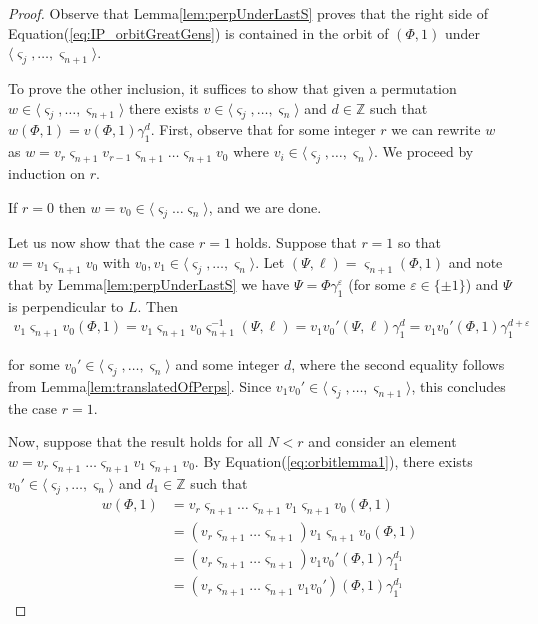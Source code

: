 \documentclass[final]{amsart}
\theoremstyle{plain}
\theoremstyle{definition}
\theoremstyle{remark}
\numberwithin{equation}{section}
\renewcommand{\epsilon}{\varepsilon} \renewcommand{\subset}{\subseteq} \renewcommand{\supset}{\supseteq} \renewcommand{\subsetneq}{\varsubsetneq}
\renewcommand{\{}{\lbrace}
\renewcommand{\}}{\rbrace}
\newcommand{\bZ}{\mathbb{Z}}
\newcommand{\es}{\varsigma}
\begin{document}
\begin{proof}
   Observe that Lemma\nobreakspace \ref {lem:perpUnderLastS} proves that the right side of Equation\nobreakspace \textup {(\ref {eq:IP_orbitGreatGens})} is contained in the orbit of $(\Phi,1)$ under $\langle \es_{j}, \dots, \es_{n+1}\rangle$.
   


  
  To prove the other inclusion, it suffices to show that given a permutation $w \in \langle \es_j, \ldots, \es_{n+1} \rangle$ there exists $v \in \langle \es_j, \ldots, \es_{n} \rangle$ and $d \in \bZ$ such that $w(\Phi,1) = v(\Phi,1)\gamma_1^d$. First, observe that for some integer $r$ we can rewrite $w$ as $w = v_r \es_{n+1} v_{r-1} \es_{n+1} \ldots \es_{n+1}v_0$ where $v_i \in \langle \es_j, \ldots , \es_{n} \rangle$. We proceed by induction on $r$. 


If $r=0$ then $w = v_0 \in \langle \es_j \ldots \es_{n} \rangle$, and we are done.

Let us now show that the case $r=1$ holds. Suppose that $r=1$ so that $w = v_1 \es_{n+1} v_0$ with $v_0,v_1 \in \langle \es_j , \ldots , \es_{n} \rangle$. Let $(\Psi,\ell) = \es_{n+1}(\Phi,1)$ and note that by Lemma\nobreakspace \ref {lem:perpUnderLastS} 
we have $\Psi = \Phi\gamma_1^{\epsilon}$ (for some $\epsilon \in \{\pm 1\}$) and $\Psi$ is perpendicular to $L$. Then
 \begin{align}
 \label{eq:orbitlemma1}
	  v_1 \es_{n+1} v_0 (\Phi, 1) =   v_1 \es_{n+1} v_0 \es_{n+1}^{-1}(\Psi, \ell) = v_1v_0'(\Psi,\ell)\gamma_1^{d} = v_1v_0'(\Phi,1)\gamma_1^{d+\epsilon}
  \end{align}

  for some $v_0' \in \langle \es_j, \ldots, \es_{n} \rangle$ and some integer $d$, where the second equality follows from Lemma\nobreakspace \ref {lem:translatedOfPerps}. Since $v_1v_0' \in \langle \es_j, \ldots, \es_{n+1} \rangle$, this concludes the case $r=1$.

  Now, suppose that the result holds for all $N < r$ and consider an element $w = v_r \es_{n+1} \ldots \es_{n+1}v_1 \es_{n+1}v_0$. By Equation\nobreakspace \textup {(\ref {eq:orbitlemma1})}, there exists $v_0' \in \langle \es_j,\ldots, \es_n \rangle$ and $d_1 \in \bZ$ such that
\begin{align}
   w(\Phi,1) 
   &= v_r \es_{n+1} \ldots \es_{n+1}v_1 \es_{n+1}v_0(\Phi,1) \nonumber \\
   &= (v_r \es_{n+1} \ldots \es_{n+1})v_1 \es_{n+1}v_0(\Phi,1) \nonumber \\
   &= (v_r \es_{n+1} \ldots \es_{n+1})v_1v_0'(\Phi,1)\gamma_1^{d_1} \nonumber \\
   &= (v_r \es_{n+1} \ldots \es_{n+1}v_1v_0')(\Phi,1)\gamma_1^{d_1} \label{eq:ladearriba}
  \end{align}



\end{proof}
\end{document}
